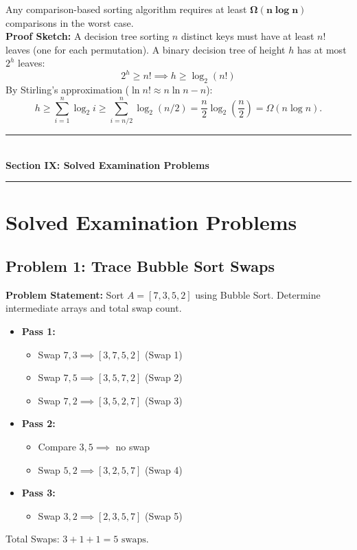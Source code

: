 \begin{tcolorbox}[title=\textbf{Theorem: Lower Bound for Comparison-Based Sorting}]
Any comparison-based sorting algorithm requires at least $\mathbf{\Omega(n \log n)}$ comparisons in the worst case.\\
\textbf{Proof Sketch:} A decision tree sorting $n$ distinct keys must have at least $n!$ leaves (one for each permutation). A binary decision tree of height $h$ has at most $2^h$ leaves:
\[
2^h \geq n! \implies h \geq \log_2(n!)
\]
By Stirling's approximation ($\ln n! \approx n \ln n - n$):
\[
h \geq \sum_{i=1}^n \log_2 i \geq \sum_{i=n/2}^n \log_2(n/2) = \frac{n}{2} \log_2\left(\frac{n}{2}\right) = \Omega(n \log n).
\]
\end{tcolorbox}

\newpage
\begin{center}
\vspace{0.5em}
{\color{primary}\rule{0.45\textwidth}{1.2pt}}\\[4pt]
{\Large\bfseries\color{primary} Section IX: Solved Examination Problems}\\[2pt]
{\color{primary}\rule{0.45\textwidth}{1.2pt}}
\vspace{0.5em}
\end{center}

\section{Solved Examination Problems}

\subsection{Problem 1: Trace Bubble Sort Swaps}
\textbf{Problem Statement:} Sort $A = [7, 3, 5, 2]$ using Bubble Sort. Determine intermediate arrays and total swap count.
\begin{itemize}
    \item \textbf{Pass 1:}
    \begin{itemize}
        \item Swap $7, 3 \implies [3, 7, 5, 2]$ (Swap 1)
        \item Swap $7, 5 \implies [3, 5, 7, 2]$ (Swap 2)
        \item Swap $7, 2 \implies [3, 5, 2, 7]$ (Swap 3)
    \end{itemize}
    \item \textbf{Pass 2:}
    \begin{itemize}
        \item Compare $3, 5 \implies$ no swap
        \item Swap $5, 2 \implies [3, 2, 5, 7]$ (Swap 4)
    \end{itemize}
    \item \textbf{Pass 3:}
    \begin{itemize}
        \item Swap $3, 2 \implies [2, 3, 5, 7]$ (Swap 5)
    \end{itemize}
\end{itemize}
Total Swaps: $\boxed{3 + 1 + 1 = 5 \text{ swaps}}$.

